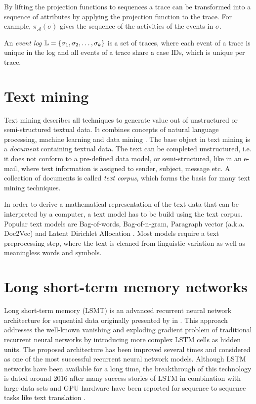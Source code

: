 By lifting the projection functions to sequences a trace can be transformed into a sequence of attributes by applying the projection function to the trace.
For example, $\pi_\mathcal{A}(\sigma)$ gives the sequence of the activities of the events in $\sigma$.

\begin{definition}
	An \textit{event log} $\mathbb{L} = \{ \sigma_1, \sigma _2, \dots, \sigma_k \}$ is a set of traces, where each event of a trace is unique in the log and all events of a trace share a case IDs, which is unique per trace.
\end{definition}

\section{Text mining}

Text mining describes all techniques to generate value out of unstructured or semi-structured textual data.
It combines concepts of natural language processing, machine learning and data mining \cite{DBLP:journals/coling/Mihalcea08}.
The base object in text mining is a \textit{document} containing textual data.
The text can be completed unstructured, i.e. it does not conform to a pre-defined data model, or semi-structured, like in an e-mail, where text information is assigned to sender, subject, message etc.
A collection of documents is called \textit{text corpus}, which forms the basis for many text mining techniques.

In order to derive a mathematical representation of the text data that can be interpreted by a computer, a text model has to be build using the text corpus.
Popular text models are Bag-of-words, Bag-of-n-gram, Paragraph vector (a.k.a. Doc2Vec) \cite{DBLP:conf/icml/LeM14} and Latent Dirichlet Allocation \cite{DBLP:journals/jmlr/BleiNJ03}.
Most models require a text preprocessing step, where the text is cleaned from linguistic variation as well as meaningless words and symbols.


\section{Long short-term memory networks}

Long short-term memory (LSMT) is an advanced recurrent neural network architecture for sequential data originally presented by \citeauthor{DBLP:journals/neco/HochreiterS97} in \citeyear{DBLP:journals/neco/HochreiterS97}  \cite{DBLP:journals/neco/HochreiterS97}.
This approach addresses the well-known vanishing and exploding gradient problem \cite{DBLP:conf/icml/PascanuMB13}  of traditional recurrent neural networks by introducing more complex LSTM cells as hidden units.
The proposed architecture has been improved several times \cite{DBLP:journals/neco/GersSC00} \cite {DBLP:journals/tnn/GreffSKSS17} and considered as one of the most successful recurrent neural network models.
Although LSTM networks have been available for a long time, the breakthrough of this technology is dated around 2016 after many success stories of LSTM in combination with large data sets and GPU hardware have been reported for sequence to sequence tasks like text translation \cite{DBLP:journals/corr/WuSCLNMKCGMKSJL16}.

